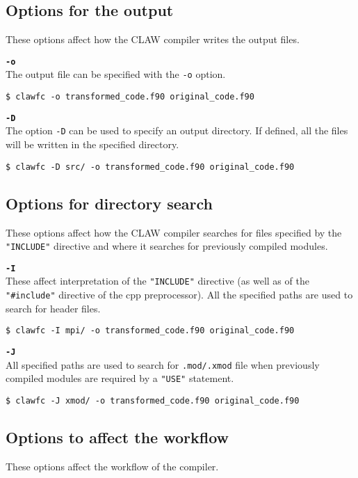 \documentclass{article}
\begin{document}
\subsection{Options for the output}
These options affect how the CLAW compiler writes the output files.

\textbf{\texttt{-o}}\\
The output file can be specified with the \texttt{-o} option. 
\begin{lstlisting}
$ clawfc -o transformed_code.f90 original_code.f90
\end{lstlisting}

\textbf{\texttt{-D}}\\
The option \texttt{-D} can be used to specify an output directory. If defined, all the files 
will be written in the specified directory.

\begin{lstlisting}
$ clawfc -D src/ -o transformed_code.f90 original_code.f90
\end{lstlisting}

\subsection{Options for directory search}
These options affect how the CLAW compiler searches for files specified by the
\texttt{"INCLUDE"} directive and where it searches for previously compiled modules.

\textbf{\texttt{-I}}\\
These affect interpretation of the \texttt{"INCLUDE"} directive (as well as of the \texttt{"\#include"} directive of the cpp preprocessor).
All the specified paths are used to search for header files.
\begin{lstlisting}
$ clawfc -I mpi/ -o transformed_code.f90 original_code.f90
\end{lstlisting}

\textbf{\texttt{-J}}\\
All specified paths are used to search for \texttt{.mod/.xmod} file when previously compiled modules are required by a \texttt{"USE"} statement.
\begin{lstlisting}
$ clawfc -J xmod/ -o transformed_code.f90 original_code.f90
\end{lstlisting}

\subsection{Options to affect the workflow}
These options affect the workflow of the compiler. 
\end{document}
